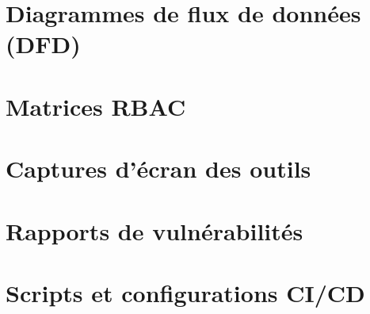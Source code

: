 \documentclass[12pt, a4paper, oneside]{report}
\begin{document}

\clearpage



\appendix
\renewcommand{\chaptername}{Annexe}

\chapter{Diagrammes de flux de données (DFD)}
\label{ann:dfd}

\chapter{Matrices RBAC}
\label{ann:rbac}

\chapter{Captures d'écran des outils}
\label{ann:captures}

\chapter{Rapports de vulnérabilités}
\label{ann:vulns}

\chapter{Scripts et configurations CI/CD}
\label{ann:scripts}
\end{document}
